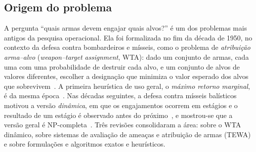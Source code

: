 \documentclass[11pt,a4paper]{article}
\begin{document}
\subsection{Origem do problema}
A pergunta ``quais armas devem engajar quais alvos?'' é um dos problemas mais antigos da pesquisa operacional. Ela foi
formalizada no fim da década de 1950, no contexto da defesa contra bombardeiros e mísseis, como o problema de
\emph{atribuição arma--alvo} (\emph{weapon--target assignment}, WTA): dado um conjunto de armas, cada uma com uma
probabilidade de destruir cada alvo, e um conjunto de alvos de valores diferentes, escolher a designação que minimiza o
valor esperado dos alvos que sobrevivem~\cite{manne1958}. A primeira heurística de uso geral, o \emph{máximo retorno
marginal}, é da mesma época~\cite{denbroeder1959}. Nas décadas seguintes, a defesa contra mísseis balísticos motivou a
versão \emph{dinâmica}, em que os engajamentos ocorrem em estágios e o resultado de um estágio é observado antes do
próximo~\cite{hosein1990}, e mostrou-se que a versão geral é NP-completa~\cite{lloyd1986}. Três revisões consolidaram a
área: \citet{cai2006} sobre o WTA dinâmico, \citet{roux2007} sobre sistemas de avaliação de ameaças e atribuição de
armas (TEWA) e \citet{kline2019} sobre formulações e algoritmos exatos e heurísticos.
\end{document}

